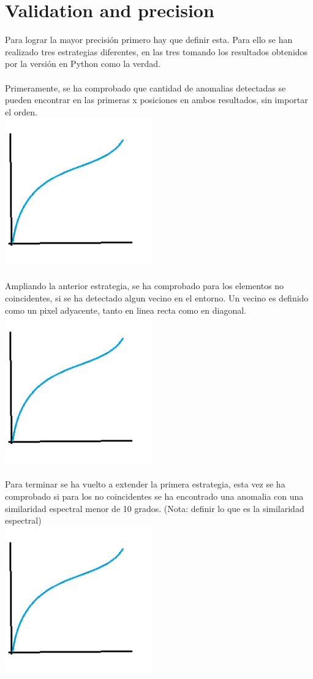 \section{Validation and precision}
Para lograr la mayor precisión primero hay que definir esta.
Para ello se han realizado tres estrategias diferentes, en las tres tomando los resultados obtenidos por la versión en Python como la verdad.
\\
\\
Primeramente, se ha comprobado que cantidad de anomalias detectadas se pueden encontrar en las primeras x posiciones en ambos resultados, sin importar el orden.
\\
\includegraphics[height=2.5in]{figures/precision.png}
\\
\\
Ampliando la anterior estrategia, se ha comprobado para los elementos no coincidentes, si se ha detectado algun vecino en el entorno. Un vecino es definido como un pixel adyacente, tanto en linea recta como en diagonal.
\\
\includegraphics[height=2.5in]{figures/precision.png}
\\
\\
Para terminar se ha vuelto a extender la primera estrategia, esta vez se ha comprobado si para los no coincidentes se ha encontrado una anomalia con una similaridad espectral menor de 10 grados. (Nota: definir lo que es la similaridad espectral)
\\
\includegraphics[height=2.5in]{figures/precision.png}
\\
\\